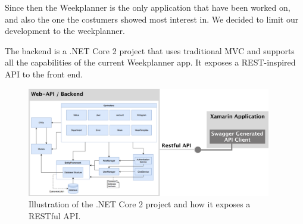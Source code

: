 Since then the Weekplanner is the only application that have been worked on, and also the one the costumers showed most interest in. We decided to limit our development to the weekplanner. 


The backend is a .NET Core 2 project that uses traditional MVC and supports all the capabilities of the current Weekplanner app. It exposes a REST-inspired API to the front end.
\begin{figure}[H]
        \begin{center}
            \includegraphics[width=0.95\textwidth]{figures/RestAPIFigure.pdf}
        \end{center}
        \caption{Illustration of the .NET Core 2 project and how it exposes a RESTful API.}
        \label{fig:RestAPIFigure}
\end{figure}

